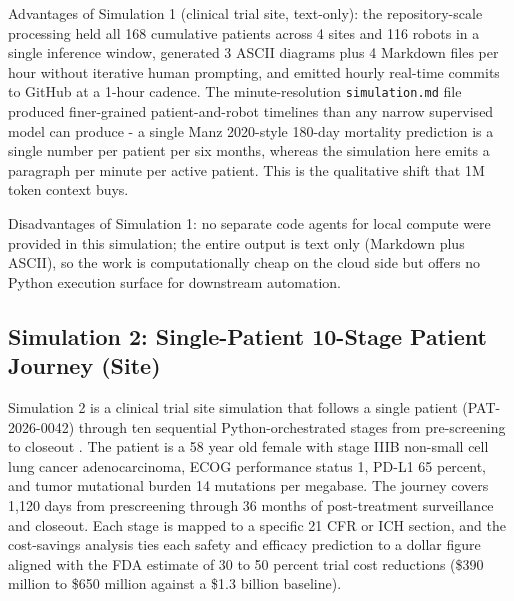Advantages of Simulation 1 (clinical trial site, text-only): the
repository-scale processing held all 168 cumulative patients across 4
sites and 116 robots in a single inference window, generated 3 ASCII
diagrams plus 4 Markdown files per hour without iterative human
prompting, and emitted hourly real-time commits to GitHub at a
1-hour cadence. The minute-resolution \texttt{simulation.md} file
produced finer-grained patient-and-robot timelines than any narrow
supervised model can produce - a single Manz 2020-style 180-day
mortality prediction is a single number per patient per six months,
whereas the simulation here emits a paragraph per minute per active
patient. This is the qualitative shift that 1M token context buys.

Disadvantages of Simulation 1: no separate code agents for local
compute were provided in this simulation; the entire output is text
only (Markdown plus ASCII), so the work is computationally cheap on
the cloud side but offers no Python execution surface for downstream
automation. 

\subsection{Simulation 2: Single-Patient 10-Stage Patient Journey (Site)}
\label{sec:results-sim2}

Simulation 2 is a clinical trial site simulation that follows a single
patient (PAT-2026-0042) through ten sequential Python-orchestrated
stages from pre-screening to closeout
\cite{kawchak_2026_19119939, kawchak_2026_18810541}. The patient is
a 58 year old female with stage IIIB non-small cell lung cancer
adenocarcinoma, ECOG performance status 1, PD-L1 65 percent, and
tumor mutational burden 14 mutations per megabase. The journey covers
1,120 days from prescreening through 36 months of post-treatment
surveillance and closeout. Each stage is mapped to a specific 21 CFR
or ICH section, and the cost-savings analysis ties each safety and
efficacy prediction to a dollar figure aligned with the FDA estimate
of 30 to 50 percent trial cost reductions (\$390 million to \$650
million against a \$1.3 billion baseline).

